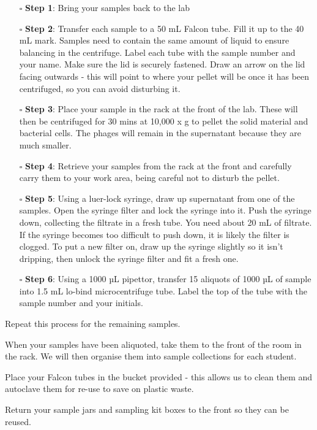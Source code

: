 \documentclass[
]{book}
\providecommand{\tightlist}{%
  \setlength{\itemsep}{0pt}\setlength{\parskip}{0pt}}
\begin{document}
\begin{itemize}
\tightlist
\item[$\square$]
  \textbf{Step 1}: Bring your samples back to the lab
\item[$\square$]
  \textbf{Step 2}: Transfer each sample to a 50 mL Falcon tube. Fill it up to the 40 mL mark. Samples need to contain the same amount of liquid to ensure balancing in the centrifuge. Label each tube with the sample number and your name. Make sure the lid is securely fastened. Draw an arrow on the lid facing outwards - this will point to where your pellet will be once it has been centrifuged, so you can avoid disturbing it.
\item[$\square$]
  \textbf{Step 3}: Place your sample in the rack at the front of the lab. These will then be centrifuged for 30 mins at 10,000 x g to pellet the solid material and bacterial cells. The phages will remain in the supernatant because they are much smaller.
\item[$\square$]
  \textbf{Step 4}: Retrieve your samples from the rack at the front and carefully carry them to your work area, being careful not to disturb the pellet.
\item[$\square$]
  \textbf{Step 5}: Using a luer-lock syringe, draw up supernatant from one of the samples. Open the syringe filter and lock the syringe into it. Push the syringe down, collecting the filtrate in a fresh tube. You need about 20 mL of filtrate. If the syringe becomes too difficult to push down, it is likely the filter is clogged. To put a new filter on, draw up the syringe slightly so it isn't dripping, then unlock the syringe filter and fit a fresh one.
\item[$\square$]
  \textbf{Step 6}: Using a 1000 µL pipettor, transfer 15 aliquots of 1000 µL of sample into 1.5 mL lo-bind microcentrifuge tube. Label the top of the tube with the sample number and your initials.
\end{itemize}

Repeat this process for the remaining samples.

When your samples have been aliquoted, take them to the front of the room in the rack. We will then organise them into sample collections for each student.

Place your Falcon tubes in the bucket provided - this allows us to clean them and autoclave them for re-use to save on plastic waste.

Return your sample jars and sampling kit boxes to the front so they can be reused.
\end{document}
